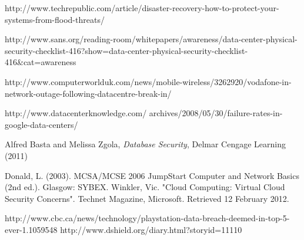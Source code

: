 \documentclass[11pt, twocolumn]{article}
\begin{document}
\begin{thebibliography}{}
  http://www.techrepublic.com/article/disaster-recovery-how-to-protect-your-systems-from-flood-threats/

  http://www.sans.org/reading-room/whitepapers/awareness/data-center-physical-security-checklist-416?show=data-center-physical-security-checklist-416\&cat=awareness

  http://www.computerworlduk.com/news/mobile-wireless/3262920/vodafone-in-network-outage-following-datacentre-break-in/

  http://www.datacenterknowledge.com/ archives/2008/05/30/failure-rates-in-google-data-centers/

  Alfred Basta and Melissa Zgola, {\it Database Security}, Delmar Cengage Learning (2011)

 Donald, L. (2003). MCSA/MCSE 2006 JumpStart Computer and Network Basics (2nd ed.). Glasgow: SYBEX.
 Winkler, Vic. "Cloud Computing: Virtual Cloud Security Concerns". Technet Magazine, Microsoft. Retrieved 12 February 2012.

 http://www.cbc.ca/news/technology/playstation-data-breach-deemed-in-top-5-ever-1.1059548
 http://www.dshield.org/diary.html?storyid=11110

\end{thebibliography}
\end{document}

